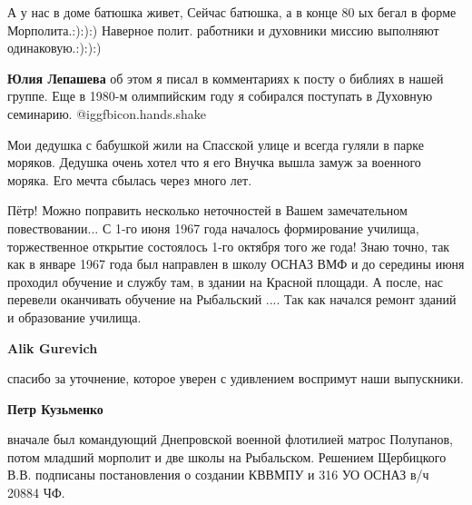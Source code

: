 \begin{itemize}

А у нас в доме батюшка живет, Сейчас батюшка, а в конце 80 ых бегал в форме
Морполита.:):):) Наверное полит. работники и духовники миссию выполняют
одинаковую.:):):)

\begin{itemize} %
\textbf{Юлия Лепашева} об этом я писал в комментариях к посту о библиях в нашей группе. Еще в 1980-м олимпийским году я собирался поступать в Духовную семинарию.  @igg{fbicon.hands.shake} 
\end{itemize} %


Мои дедушка с бабушкой жили на Спасской улице и всегда гуляли в парке моряков.
Дедушка очень хотел что я его Внучка вышла замуж за военного моряка. Его мечта
сбылась через много лет.


Пётр! Можно поправить несколько неточностей в Вашем замечательном
повествовании... С 1-го июня 1967 года началось формирование училища,
торжественное открытие состоялось 1-го октября того же года! Знаю точно, так
как в январе 1967 года был направлен в школу ОСНАЗ ВМФ и до середины июня
проходил обучение и службу там, в здании на Красной площади. А после, нас
перевели оканчивать обучение на Рыбальский .... Так как начался ремонт зданий и
образование училища.

\begin{itemize} %
\textbf{Alik Gurevich} 

спасибо за уточнение, которое уверен с удивлением воспримут наши выпускники.

\textbf{Петр Кузьменко} 

вначале был командующий Днепровской военной флотилией матрос Полупанов, потом
младший морполит и две школы на Рыбальском. Решением Щербицкого В.В. подписаны
постановления о создании КВВМПУ и 316 УО ОСНАЗ в/ч 20884 ЧФ.

\end{itemize} %

\end{itemize} %
